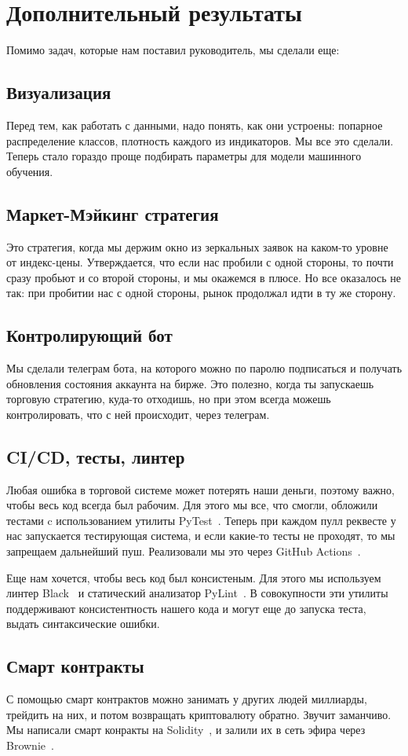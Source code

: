 \section{Дополнительный результаты}

Помимо задач, которые нам поставил руководитель, мы сделали еще:

\subsection{Визуализация}
Перед тем, как работать с данными, надо понять, как они устроены: попарное распределение классов, плотность каждого из индикаторов. Мы все это сделали. Теперь стало гораздо проще подбирать параметры для модели машинного обучения.

\subsection{Маркет-Мэйкинг стратегия}
Это стратегия, когда мы держим окно из зеркальных заявок на каком-то уровне от индекс-цены. Утверждается, что если нас пробили с одной стороны, то почти сразу пробьют и со второй стороны, и мы окажемся в плюсе. Но все оказалось не так: при пробитии нас с одной стороны, рынок продолжал идти в ту же сторону.

\subsection{Контролирующий бот}
Мы сделали телеграм бота, на которого можно по паролю подписаться и получать обновления состояния аккаунта на бирже. Это полезно, когда ты запускаешь торговую стратегию, куда-то отходишь, но при этом всегда можешь контролировать, что с ней происходит, через телеграм.

\subsection{CI/CD, тесты, линтер}
Любая ошибка в торговой системе может потерять наши деньги, поэтому важно, чтобы весь код всегда был рабочим. Для этого мы все, что смогли, обложили тестами c использованием утилиты PyTest~\cite{Pytest}. Теперь при каждом пулл реквесте у нас запускается тестирующая система, и если какие-то тесты не проходят, то мы запрещаем дальнейший пуш. Реализовали мы это через GitHub Actions~\cite{GitHubActions}.

Еще нам хочется, чтобы весь код был консистеным. Для этого мы используем линтер Black~\cite{Black} и статический анализатор PyLint~\cite{Pylint}. В совокупности эти утилиты поддерживают консистентность нашего кода и могут еще до запуска теста, выдать синтаксические ошибки.

\subsection{Смарт контракты}
С помощью смарт контрактов можно занимать у других людей миллиарды, трейдить на них, и потом возвращать криптовалюту обратно. Звучит заманчиво. Мы написали смарт конракты на Solidity~\cite{Solidity}, и залили их в сеть эфира через Brownie~\cite{Brownie}.